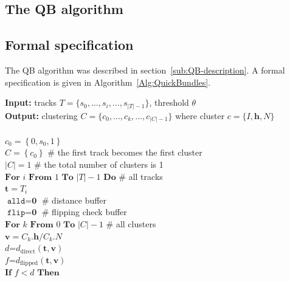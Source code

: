 \documentclass[preprint,authoryear,a4paper,10pt,onecolumn]{elsarticle}
\begin{document}
\begin{appendices}

\section{The QB algorithm\label{Sec:QB-Algorithm}}

\subsection{Formal specification\label{sub:QB-specification}}

The QB algorithm was described in section~\ref{sub:QB-description}. A formal
specification is given in Algorithm~\ref{Alg:QuickBundles}.

\begin{algorithm}
\textbf{Input:} tracks $T=\{s_{0},...,s_{i},...,s_{|T|-1}\}$, threshold $\theta $\\
\textbf{Output:} clustering $C=\{c_{0},...,c_{k},...,c_{|C|-1}\}$ where cluster $c=\{I,\mathbf{h},N\}$\\
\\
$c_{0}=\left\{0,s_{0},1\right\}$\\
$C=\left\{c_{0}\right\}$ \# the first track becomes the first cluster\\
$|C|=1$ \# the total number of clusters is 1 \\
$\textbf{For}$ $i$ $\textbf{From}$ $1$ $\textbf{To}$ $|T|-1$ $\textbf{Do}$ \# all tracks\\
\hspace*{2em} $\textbf{t}=T_{i}$\\
\hspace*{2em} $\texttt{alld}=\textbf{0}$ \# distance buffer\\
\hspace*{2em} $\texttt{flip}=\textbf{0}$ \# flipping check buffer\\
\hspace*{2em} $\textbf{For}$ $k$ $\textbf{From}$ $0$ $\textbf{To}$ $|C|-1$ \# all clusters\\
\hspace*{4em} $\mathbf{v}=C_{k}.\mathbf{h}/C_{k}.N$\\ 
\hspace*{4em} $d$=$d_{\textrm{direct}}(\mathbf{t},\mathbf{v})$\\
\hspace*{4em} $f$=$d_{\textrm{flipped}}(\mathbf{t},\mathbf{v})$\\
\hspace*{4em} $\textbf{If}$ $f < d$ $\textbf{Then}$\\

\end{algorithm}
\end{appendices}
\end{document}
